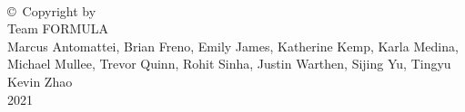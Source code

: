
\thispagestyle{empty}
\hbox{\ }

\vfill
\renewcommand{\baselinestretch}{1}
\small\normalsize

\vspace{.5in}

\begin{center}
\large{\copyright \hbox{ }Copyright by\\
Team FORMULA \\
Marcus Antomattei, Brian Freno, Emily James, Katherine Kemp, Karla Medina, Michael Mullee, Trevor Quinn, Rohit Sinha, Justin Warthen, Sijing Yu, Tingyu Kevin Zhao
\\
2021}
\end{center}

\vfill

\newpage 
